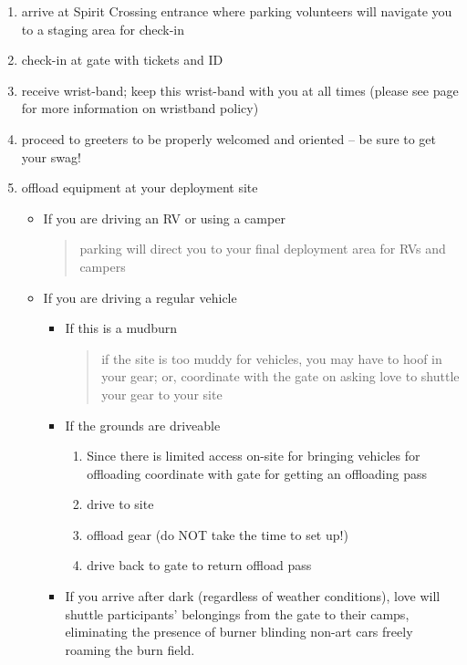 \begin{enumerate}[noitemsep]
	\item arrive at Spirit Crossing entrance where \gls{parking} volunteers will navigate you to a staging area for check-in
    \item check-in at \gls{gate} with tickets and ID
    \item receive wrist-band; keep this wrist-band with you at all times (please see page \pageref{sub:wristbands} for more information on wristband policy)
    \item proceed to \glspl{greeter} to be properly welcomed and oriented -- be sure to get your swag!
 	\item offload equipment at your deployment site
      \begin{itemize}
          \item If you are driving an RV or using a camper
              \begin{quote}
                  \gls{parking} will direct you to your final deployment area for RVs and campers
              \end{quote}
          \item If you are driving a regular vehicle
              \begin{itemize}
          		\item If this is a \gls{mudburn}
              		\begin{quote}
              			if the site is too muddy for vehicles, you may have to hoof in your gear; or, coordinate with the \gls{gate} on asking \gls{love} to shuttle your gear to your site
              		\end{quote}
          		\item If the grounds are driveable
              		\begin{enumerate}
                       \item Since there is limited access on-site for bringing vehicles for offloading coordinate with \gls{gate} for getting an offloading pass 
                       \item drive to site
                       \item offload gear (do NOT take the time to set up!)
                       \item drive back to \gls{gate} to return offload pass
                    \end{enumerate}
                \item If you arrive after dark (regardless of weather conditions), \gls{love} will shuttle participants' belongings from the \gls{gate} to their camps, eliminating the presence of burner blinding non-art cars freely roaming the burn field.

\end{itemize}
\end{itemize}
\end{enumerate}
